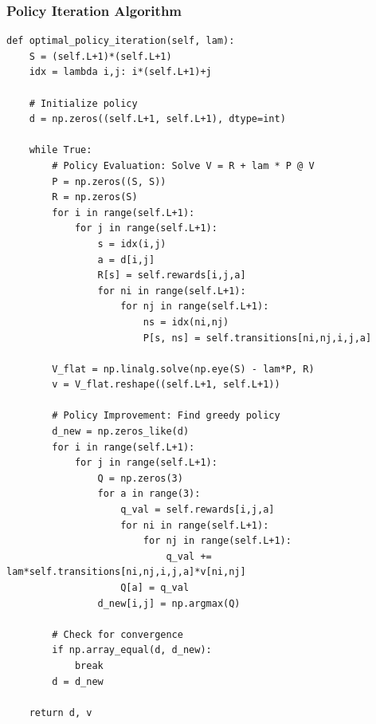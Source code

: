 \documentclass[12pt]{article}
\begin{document}
\subsubsection{Policy Iteration Algorithm}
\begin{lstlisting}[caption=Policy Iteration Algorithm]
def optimal_policy_iteration(self, lam):
    S = (self.L+1)*(self.L+1)
    idx = lambda i,j: i*(self.L+1)+j
    
    # Initialize policy
    d = np.zeros((self.L+1, self.L+1), dtype=int)
    
    while True:
        # Policy Evaluation: Solve V = R + lam * P @ V
        P = np.zeros((S, S))
        R = np.zeros(S)
        for i in range(self.L+1):
            for j in range(self.L+1):
                s = idx(i,j)
                a = d[i,j]
                R[s] = self.rewards[i,j,a]
                for ni in range(self.L+1):
                    for nj in range(self.L+1):
                        ns = idx(ni,nj)
                        P[s, ns] = self.transitions[ni,nj,i,j,a]
        
        V_flat = np.linalg.solve(np.eye(S) - lam*P, R)
        v = V_flat.reshape((self.L+1, self.L+1))
        
        # Policy Improvement: Find greedy policy
        d_new = np.zeros_like(d)
        for i in range(self.L+1):
            for j in range(self.L+1):
                Q = np.zeros(3)
                for a in range(3):
                    q_val = self.rewards[i,j,a]
                    for ni in range(self.L+1):
                        for nj in range(self.L+1):
                            q_val += lam*self.transitions[ni,nj,i,j,a]*v[ni,nj]
                    Q[a] = q_val
                d_new[i,j] = np.argmax(Q)
        
        # Check for convergence
        if np.array_equal(d, d_new):
            break
        d = d_new
    
    return d, v
\end{lstlisting}
\end{document}
